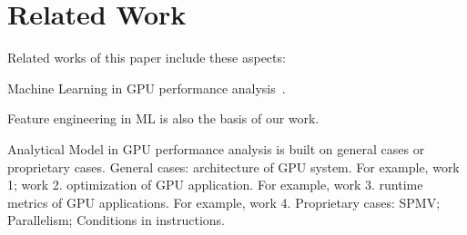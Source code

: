 \section{Related Work}

Related works of this paper include these aspects:


Machine Learning in GPU performance analysis~\cite{nguyen:yak}. 

Feature engineering in ML is also the basis of our work.


Analytical Model in GPU performance analysis is built on general cases or proprietary cases.
General cases:
architecture of GPU system. For example, work 1; work 2.
optimization of GPU application. For example, work 3.
runtime metrics of GPU applications. For example, work 4.
Proprietary cases:
SPMV; Parallelism; Conditions in instructions.

